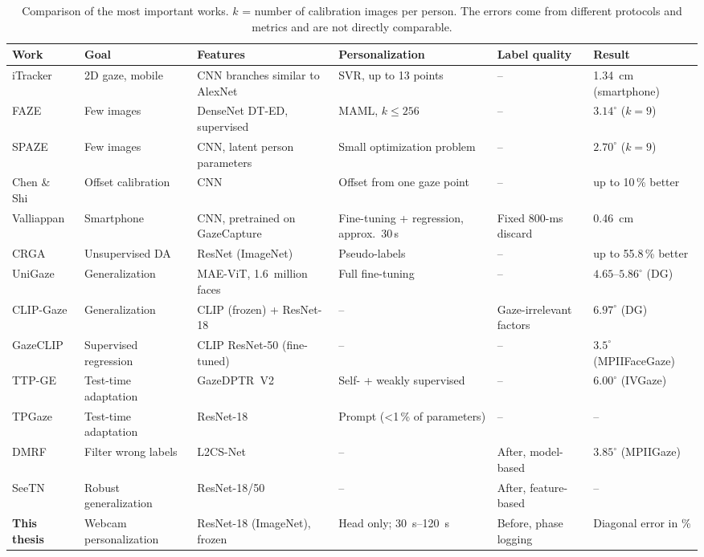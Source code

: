 \begin{table}[htbp]
  \centering
  \footnotesize
  \setlength{\tabcolsep}{3pt}
  \caption[Comparison of the most important works]{Comparison of the most important works. $k$ = number of calibration images per person. The errors come from different protocols and metrics and are not directly comparable.}
  \label{tab:sota_vergleich}
  \begin{tabularx}{\textwidth}{L{2.3cm} L{2.4cm} L{2.6cm} L{2.6cm} Y L{1.9cm}}
    \toprule
    \textbf{Work} & \textbf{Goal} & \textbf{Features} & \textbf{Personalization} & \textbf{Label quality} & \textbf{Result} \\
    \midrule
    iTracker~\cite{krafka2016itracker} & 2D gaze, mobile & CNN branches similar to AlexNet & SVR, up to 13 points & -- & \SI{1.34}{\centi\metre} (smartphone) \\
    FAZE~\cite{park2019faze} & Few images & DenseNet DT-ED, supervised & MAML, $k \le 256$ & -- & $3.14^\circ$ ($k=9$) \\
    SPAZE~\cite{linden2019spaze} & Few images & CNN, latent person parameters & Small optimization problem & -- & $2.70^\circ$ ($k=9$) \\
    Chen \& Shi~\cite{chen2020offset} & Offset calibration & CNN & Offset from one gaze point & -- & up to 10\,\% better \\
    Valliappan~\cite{valliappan2020smartphone} & Smartphone & CNN, pretrained on GazeCapture & Fine-tuning + regression, approx.\ 30\,s & Fixed 800-ms discard & \SI{0.46}{\centi\metre} \\
    CRGA~\cite{wang2022crga} & Unsupervised DA & ResNet (ImageNet) & Pseudo-labels & -- & up to 55.8\,\% better \\
    UniGaze~\cite{qin2026unigaze} & Generalization & MAE-ViT, 1.6~million faces & Full fine-tuning & -- & $4.65$--$5.86^\circ$ (DG) \\
    CLIP-Gaze~\cite{yin2024clipgaze} & Generalization & CLIP (frozen) + ResNet-18 & -- & Gaze-irrelevant factors & $6.97^\circ$ (DG) \\
    GazeCLIP~\cite{wang2026gazeclip} & Supervised regression & CLIP ResNet-50 (fine-tuned) & -- & -- & $3.5^\circ$ (MPIIFaceGaze) \\
    TTP-GE~\cite{nagpure2025ttpge} & Test-time adaptation & GazeDPTR~V2 & Self- + weakly supervised & -- & $6.00^\circ$ (IVGaze) \\
    TPGaze~\cite{liu2024tpgaze} & Test-time adaptation & ResNet-18 & Prompt (<1\,\% of parameters) & -- & -- \\
    DMRF~\cite{jiang2026dmrf} & Filter wrong labels & L2CS-Net & -- & After, model-based & $3.85^\circ$ (MPIIGaze) \\
    SeeTN~\cite{peng2026seetn} & Robust generalization & ResNet-18/50 & -- & After, feature-based & -- \\
    \midrule
    \textbf{This thesis} & Webcam personalization & ResNet-18 (ImageNet), frozen & Head only; \SIrange{30}{120}{\second} & Before, phase logging & Diagonal error in \% \\
    \bottomrule
  \end{tabularx}
\end{table}


